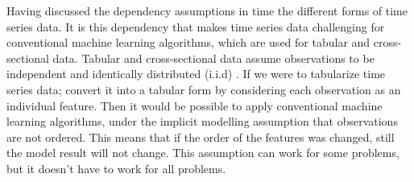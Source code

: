 Having discussed the dependency assumptions in time the different forms of time series data.
It is this dependency that makes time series data challenging for conventional machine learning algorithms, which are used for tabular and cross-sectional data.
Tabular and cross-sectional data assume observations to be independent and identically distributed (i.i.d) \cite{loning2019sktime}.\newline
If we were to tabularize time series data; convert it into a tabular form by considering each observation as an individual feature.
Then it would be possible to apply conventional machine learning algorithms, under the implicit modelling assumption that observations are not ordered.
This means that if the order of the features was changed, still the model result will not change.
This assumption can work for some problems, but it doesn't have to work for all problems.